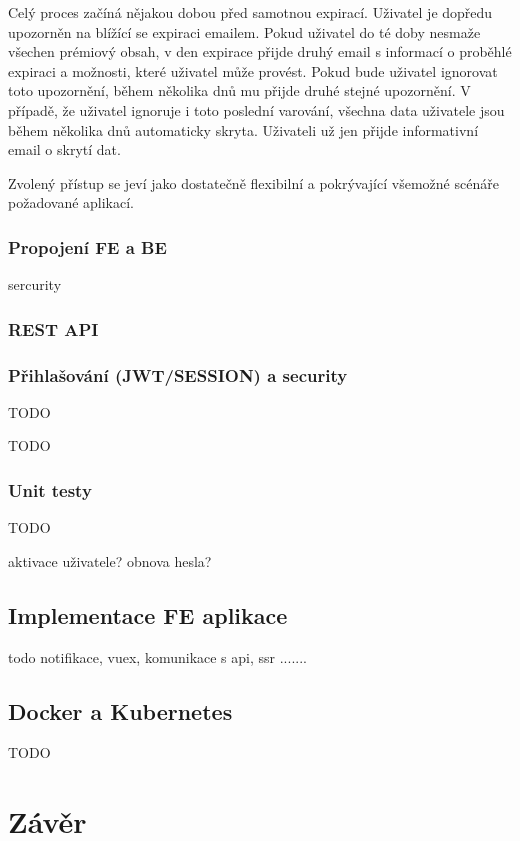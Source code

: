 \begin{itemize}
\begin{itemize}
		Celý proces začíná nějakou dobou před samotnou expirací.
		Uživatel je dopředu upozorněn na blížící se expiraci emailem.
		Pokud uživatel do té doby nesmaže všechen prémiový obsah, v den expirace přijde druhý email s informací o
		proběhlé expiraci a možnosti, které uživatel může provést.
		Pokud bude uživatel ignorovat toto upozornění, během několika dnů mu přijde druhé stejné upozornění.
		V případě, že uživatel ignoruje i toto poslední varování, všechna data uživatele jsou během několika dnů
		automaticky skryta.
		Uživateli už jen přijde informativní email o skrytí dat.

		Zvolený přístup se jeví jako dostatečně flexibilní a pokrývající všemožné scénáře požadované aplikací.

		\subsubsection{Propojení FE a BE}
		sercurity
		\subsubsection{REST API}
			\subsubsection{Přihlašování (JWT/SESSION) a security}

			TODO

		TODO

		\subsubsection{Unit testy}

		TODO

		aktivace uživatele?
		obnova hesla?

	\subsection{Implementace FE aplikace}

	todo notifikace, vuex, komunikace s api, ssr .......

	\subsection{Docker a Kubernetes}

	TODO

\section{Závěr}


\end{itemize}
\end{itemize}
